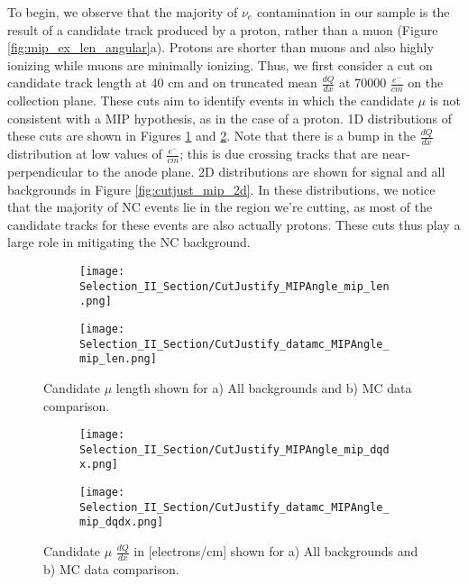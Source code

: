 \par To begin, we observe that the majority of $\nu_e$ contamination in our sample is the result of a candidate track produced by a proton, rather than a muon (Figure \ref{fig:mip_ex_len_angular}a). Protons are shorter than muons and also highly ionizing while muons are minimally ionizing. Thus, we first consider a cut on candidate track length at 40 cm and on truncated mean $\frac{dQ}{dx}$ at 70000 $\frac{e^-}{cm}$ on the collection plane. These cuts aim to identify events in which the candidate $\mu$ is not consistent with a MIP hypothesis, as in the case of a proton. 1D distributions of these cuts are shown in Figures \ref{fig:cutjust_sel2_multall_len} and \ref{fig:cutjust_sel2_multall_dqdx}. Note that there is a bump in the $\frac{dQ}{dx}$ distribution at low values of $\frac{e^-}{cm}$; this is due crossing tracks that are near-perpendicular to the anode plane.  2D distributions are shown for signal and all backgrounds in Figure \ref{fig:cutjust_mip_2d}.  In these distributions, we notice that the majority of NC events lie in the region we're cutting, as most of the candidate tracks for these events are also actually protons. These cuts thus play a large role in mitigating the NC background.

\begin{figure}[h!]
\centering
  \begin{subfigure}[t]{0.3\textwidth}
    \centering
\texttt{[image: Selection\_II\_Section/CutJustify\_MIPAngle\_mip\_len.png]}
    \caption{ }
  \end{subfigure} 
  \hspace{20mm}
  \begin{subfigure}[t]{0.3\textwidth}
    \centering
\texttt{[image: Selection\_II\_Section/CutJustify\_datamc\_MIPAngle\_mip\_len.png]}
    \caption{ }
  \end{subfigure} 

\caption{ Candidate $\mu$ length shown for a) All backgrounds and b) MC data comparison. }
\label{fig:cutjust_sel2_multall_len}
\end{figure}


\begin{figure}[H]
\centering
  \begin{subfigure}[t]{0.3\textwidth}
    \centering
\texttt{[image: Selection\_II\_Section/CutJustify\_MIPAngle\_mip\_dqdx.png]}
    \caption{ }
  \end{subfigure} 
  \hspace{20mm}
  \begin{subfigure}[t]{0.3\textwidth}
    \centering
\texttt{[image: Selection\_II\_Section/CutJustify\_datamc\_MIPAngle\_mip\_dqdx.png]}
    \caption{ }
  \end{subfigure} 
\caption{ Candidate $\mu$ $\frac{dQ}{dx}$ in [electrons/cm] shown for a) All backgrounds and b) MC data comparison. }
\label{fig:cutjust_sel2_multall_dqdx}
\end{figure}

